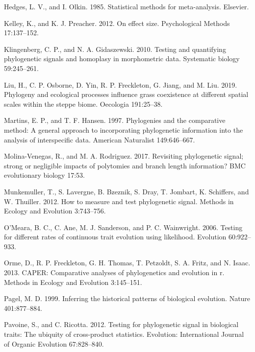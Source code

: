 \documentclass[
]{article}
\begin{document}
\leavevmode\hypertarget{ref-HedgesOlkin1985}{}%
Hedges, L. V., and I. Olkin. 1985. Statistical methods for
meta-analysis. Elsevier.

\leavevmode\hypertarget{ref-Kelley2012}{}%
Kelley, K., and K. J. Preacher. 2012. On effect size. Psychological
Methods 17:137--152.

\leavevmode\hypertarget{ref-Klingenberg2010}{}%
Klingenberg, C. P., and N. A. Gidaszewski. 2010. Testing and quantifying
phylogenetic signals and homoplasy in morphometric data. Systematic
biology 59:245--261.

\leavevmode\hypertarget{ref-Liu2019}{}%
Liu, H., C. P. Osborne, D. Yin, R. P. Freckleton, G. Jiang, and M. Liu.
2019. Phylogeny and ecological processes influence grass coexistence at
different spatial scales within the steppe biome. Oecologia 191:25--38.

\leavevmode\hypertarget{ref-MartinsHansen1997}{}%
Martins, E. P., and T. F. Hansen. 1997. Phylogenies and the comparative
method: A general approach to incorporating phylogenetic information
into the analysis of interspecific data. American Naturalist
149:646--667.

\leavevmode\hypertarget{ref-MolinaVenegas2017}{}%
Molina-Venegas, R., and M. A. Rodriguez. 2017. Revisiting phylogenetic
signal; strong or negligible impacts of polytomies and branch length
information? BMC evolutionary biology 17:53.

\leavevmode\hypertarget{ref-Munkemuller_et_al2012}{}%
Munkemuller, T., S. Lavergne, B. Bzeznik, S. Dray, T. Jombart, K.
Schiffers, and W. Thuiller. 2012. How to measure and test phylogenetic
signal. Methods in Ecology and Evolution 3:743--756.

\leavevmode\hypertarget{ref-OMeara_et_al2006}{}%
O'Meara, B. C., C. Ane, M. J. Sanderson, and P. C. Wainwright. 2006.
Testing for different rates of continuous trait evolution using
likelihood. Evolution 60:922--933.

\leavevmode\hypertarget{ref-Orme2013}{}%
Orme, D., R. P. Freckleton, G. H. Thomas, T. Petzoldt, S. A. Fritz, and
N. Isaac. 2013. CAPER: Comparative analyses of phylogenetics and
evolution in r. Methods in Ecology and Evolution 3:145--151.

\leavevmode\hypertarget{ref-Pagel1999}{}%
Pagel, M. D. 1999. Inferring the historical patterns of biological
evolution. Nature 401:877--884.

\leavevmode\hypertarget{ref-Pavoine2012}{}%
Pavoine, S., and C. Ricotta. 2012. Testing for phylogenetic signal in
biological traits: The ubiquity of cross-product statistics. Evolution:
International Journal of Organic Evolution 67:828--840.
\end{document}
